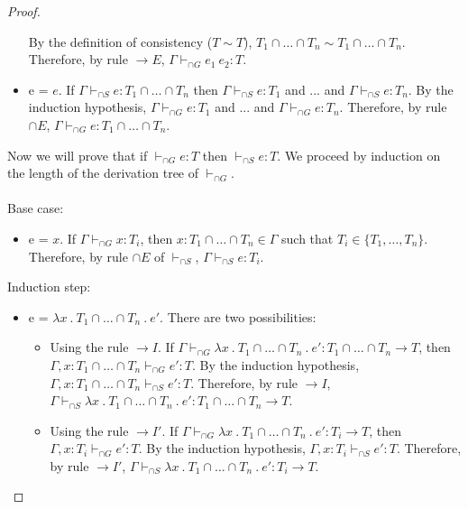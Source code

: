 \documentclass[a4paper]{article}
\begin{document}
\begin{proof}
\begin{itemize}
    By the definition of consistency ($T \sim T$), $T_1 \cap \ldots \cap T_n \sim T_1 \cap \ldots \cap T_n$.
    Therefore, by rule ${\rightarrow} E$, $\Gamma \vdash_{\cap G} e_1\ e_2 : T$.
    \item e = $e$.
    If $\Gamma \vdash_{\cap S} e : T_1 \cap \ldots \cap T_n$ then $\Gamma \vdash_{\cap S} e : T_1$ and ... and $\Gamma \vdash_{\cap S} e : T_n$.
    By the induction hypothesis, $\Gamma \vdash_{\cap G} e : T_1$ and ... and $\Gamma \vdash_{\cap G} e : T_n$.
    Therefore, by rule ${\cap} E$, $\Gamma \vdash_{\cap G} e : T_1 \cap \ldots \cap T_n$.\\
\end{itemize}
Now we will prove that if $\vdash_{\cap G} e : T$ then $\vdash_{\cap S} e : T$.
We proceed by induction on the length of the derivation tree of $\vdash_{\cap G}$.\\\\
Base case:
\begin{itemize}
    \item e = $x$.
    If $\Gamma \vdash_{\cap G} x : T_i$, then $x : T_1 \cap \ldots \cap T_n \in \Gamma$ such that $T_i \in \{T_1, \ldots, T_n\}$.
    Therefore, by rule $\cap E$ of $\vdash_{\cap S}$, $\Gamma \vdash_{\cap S} e : T_i$.\\
\end{itemize}
Induction step:
\begin{itemize}
    \item e = $\lambda x\ .\ T_1 \cap \ldots \cap T_n\ .\ e'$.
    There are two possibilities:
    \begin{itemize}
        \item Using the rule ${\rightarrow} I$.
        If $\Gamma \vdash_{\cap G} \lambda x\ .\ T_1 \cap \ldots \cap T_n\ .\ e' : T_1 \cap \ldots \cap T_n \rightarrow T$, then $\Gamma, x : T_1 \cap \ldots \cap T_n \vdash_{\cap G} e' : T$.
        By the induction hypothesis, $\Gamma, x : T_1 \cap \ldots \cap T_n \vdash_{\cap S} e' : T$.
        Therefore, by rule ${\rightarrow} I$, $\Gamma \vdash_{\cap S} \lambda x\ .\ T_1 \cap \ldots \cap T_n\ .\ e' : T_1 \cap \ldots \cap T_n \rightarrow T$.
        \item Using the rule ${\rightarrow} I'$.
        If $\Gamma \vdash_{\cap G} \lambda x\ .\ T_1 \cap \ldots \cap T_n\ .\ e' : T_i \rightarrow T$, then $\Gamma, x : T_i \vdash_{\cap G} e' : T$.
        By the induction hypothesis, $\Gamma, x : T_i \vdash_{\cap S} e' : T$.
        Therefore, by rule ${\rightarrow} I'$, $\Gamma \vdash_{\cap S} \lambda x\ .\ T_1 \cap \ldots \cap T_n\ .\ e' : T_i \rightarrow T$.

\end{itemize}
\end{itemize}
\end{proof}
\end{document}

